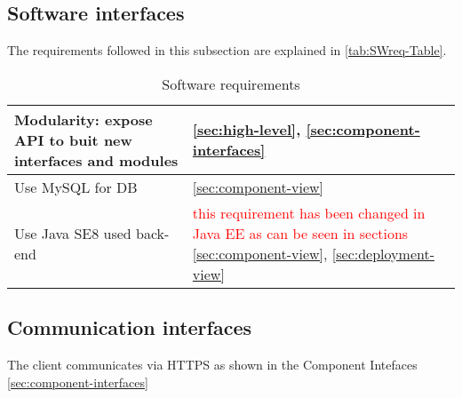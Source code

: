 \subsection{Software interfaces}

The requirements followed in this subsection are explained in \autoref{tab:SWreq-Table}.

\begin{table}[h]
\begin{center}
\begin{tabular}{|p{}|p{}|}
\hline
Modularity: expose API to buit new interfaces and modules & \ref{sec:high-level}, \ref{sec:component-interfaces}\\
\hline
Use MySQL for DB  & \ref{sec:component-view}\\
\hline
Use Java SE8 used back-end & \textcolor{red}{this requirement has been changed in Java EE as can be seen in sections} \ref{sec:component-view}, \ref{sec:deployment-view}\\
\hline
\end{tabular}
\caption{Software requirements}
\label{tab:SWreq-Table}
\end{center}
\end{table}


\subsection{Communication interfaces}
The client communicates via HTTPS as shown in the Component Intefaces \autoref{sec:component-interfaces}








